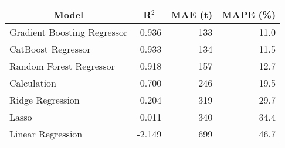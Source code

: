 
\begin{tabular}[t]{lrrr}
\toprule
\multicolumn{1}{c}{Model} & \multicolumn{1}{c}{R$^2$} & \multicolumn{1}{c}{MAE (t)} & \multicolumn{1}{c}{MAPE (\%)}\\
\midrule
Gradient Boosting Regressor & 0.936 & 133 & 11.0\\
CatBoost Regressor & 0.933 & 134 & 11.5\\
Random Forest Regressor & 0.918 & 157 & 12.7\\
Calculation & 0.700 & 246 & 19.5\\
Ridge Regression & 0.204 & 319 & 29.7\\
Lasso & 0.011 & 340 & 34.4\\
Linear Regression & -2.149 & 699 & 46.7\\
\bottomrule
\end{tabular}
